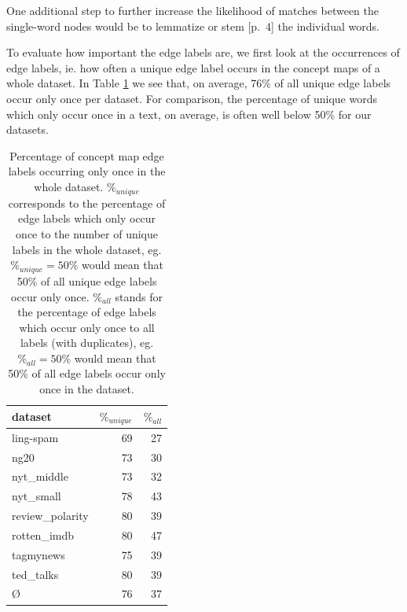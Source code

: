One additional step to further increase the likelihood of matches between the single-word nodes would be to lemmatize or stem [p.~4]\cite{Manning2000} the individual words.


To evaluate how important the edge labels are, we first look at the occurrences of edge labels, ie. how often a unique edge label occurs in the concept maps of a whole dataset.
In Table \ref{table:edge_label_occurrences} we see that, on average, 76\% of all unique edge labels occur only once per dataset. For comparison, the percentage of unique words which only occur once in a text, on average, is often well below 50\% for our datasets.

\begin{table}[htb!]
	\centering
	\begin{tabular}{lrr}
		dataset &  $ \%_{unique} $ & $ \%_{all}$  \\
		\midrule
		ling-spam       & 69 & 27 \\
		ng20            & 73 & 30 \\
		nyt\_middle      & 73 & 32 \\
		nyt\_small       & 78 & 43 \\
		review\_polarity & 80 & 39 \\
		rotten\_imdb     & 80 & 47 \\
		tagmynews       & 75 & 39 \\
		ted\_talks       & 80 & 39 \\
		\midrule
		\O           & 76 & 37 \\
		\bottomrule
	\end{tabular}
	\caption[Statistics: Percentage of concept map labels occurring once]{Percentage of concept map edge labels occurring only once in the whole dataset.
		$ \%_{unique} $ corresponds to the percentage of edge labels which only occur once to the number of unique labels in the whole dataset, eg. $ \%_{unique} = 50\% $ would mean that 50\% of all unique edge labels occur only once.
		$ \%_{all}$ stands for the percentage of edge labels which occur only once to all labels (with duplicates), eg. $ \%_{all} = 50\%$ would mean that 50\% of all edge labels occur only once in the dataset.}\label{table:edge_label_occurrences}
\end{table}

